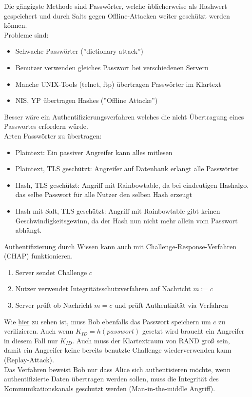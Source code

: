 \documentclass[a4paper,12pt,leqno]{article}
\begin{document}
Die gängigste Methode sind Passwörter, welche üblicherweise als Hashwert gespeichert und durch Salts gegen Offline-Attacken weiter geschützt werden können.\\
Probleme sind:
\begin{itemize}
\item Schwache Passwörter (''dictionary attack'')
\item Benutzer verwenden gleiches Passwort bei verschiedenen Servern
\item Manche UNIX-Tools (telnet, ftp) übertragen Passwörter im Klartext
\item NIS, YP übertragen Hashes (''Offline Attacke'')
\end{itemize}
Besser wäre ein Authentifizierungsverfahren welches die nicht Übertragung eines Passwortes erfordern würde.\\
Arten Passwörter zu übertragen:
\begin{itemize}
\item Plaintext: Ein passiver Angreifer kann alles mitlesen
\item Plaintext, TLS geschützt: Angreifer auf Datenbank erlangt alle Passwörter
\item Hash, TLS geschützt: Angriff mit Rainbowtable, da bei eindeutigen Hashalgo. das selbe Passwort für alle Nutzer den selben Hash erzeugt
\item Hash mit Salt, TLS geschützt: Angriff mit Rainbowtable gibt keinen Geschwindigkeitsgewinn, da der Hash nun nicht mehr allein vom Passwort abhängt.
\end{itemize}
Authentifizierung durch Wissen kann auch mit Challenge-Response-Verfahren (CHAP) funktionieren.
\begin{enumerate}
\item Server sendet Challenge $c$
\item Nutzer verwendet Integritätsschutzverfahren auf Nachricht $m:=c$
\item Server prüft ob Nachricht $m=c$ und prüft Authentizität via Verfahren
\end{enumerate}
Wie \href{figure:CHAP}{hier} zu sehen ist, muss Bob ebenfalls das Passwort speichern um $c$ zu verifizieren. Auch wenn $K_{ID}=h(passwort)$ gesetzt wird braucht ein Angreifer in diesem Fall nur $K_{ID}$. Auch muss der Klartextraum von RAND groß sein, damit ein Angreifer keine bereits benutzte Challenge wiederverwenden kann (Replay-Attack).\\
Das Verfahren beweist Bob nur dass Alice sich authentisieren möchte, wenn authentifizierte Daten übertragen werden sollen, muss die Integrität des Kommunikationskanals geschutzt werden (Man-in-the-middle Angriff).
\end{document}
